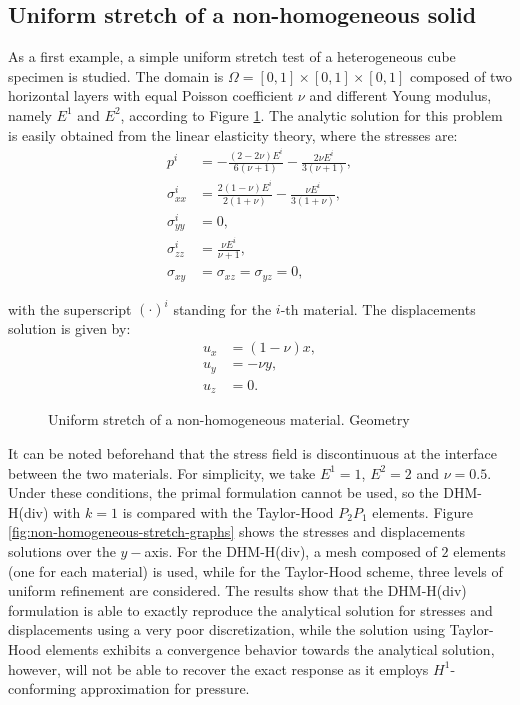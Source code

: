 \documentclass[english,11pt,3p,number,sort&compress]{elsarticle}
\begin{document}
\subsection{Uniform stretch of a non-homogeneous solid \label{subsec:non-homogeneous}}

As a first example, a simple uniform stretch test of a heterogeneous cube specimen is studied. The domain is $\Omega=[0,1] \times [0,1] \times [0,1]$ composed of two horizontal layers with equal Poisson coefficient $\nu$ and different Young modulus, namely $E^1$ and $E^2$, according to Figure \ref{fig:non-homogeneous-stretch-geometry}. The analytic solution for this problem is easily obtained from the linear elasticity theory, where the stresses are:
\begin{equation}
	\begin{aligned}
		p^i &= -\frac{(2-2 \nu ) E^i}{6 (\nu +1)}-\frac{2 \nu 
		E^i}{3 (\nu +1)}, \\
		\sigma^i_{xx} &= \frac{2(1-\nu)E^i}{2(1+\nu)}-\frac{\nu E^i}{3(1+\nu)}, \\
		\sigma^i_{yy} &= 0, \\
		\sigma^i_{zz} &= \frac{\nu E^i}{\nu +1}, \\
		\sigma_{xy} &= \sigma_{xz} = \sigma_{yz} = 0,
	\end{aligned}
\end{equation}

\noindent with the superscript $(\cdot)^i$ standing for the $i$-th material. The displacements solution is given by:
\begin{equation}
	\begin{aligned}
		u_x &= (1-\nu)x, \\
		u_y &= -\nu y, \\
		u_z &= 0.
	\end{aligned}
\end{equation}

\begin{figure}[!htb]
    \centering
    
    \caption{Uniform stretch of a non-homogeneous material. Geometry}
    \label{fig:non-homogeneous-stretch-geometry}
\end{figure}

It can be noted beforehand that the stress field is discontinuous at the interface between the two materials. For simplicity, we take $E^1=1$, $E^2=2$ and $\nu=0.5$. Under these conditions, the primal formulation cannot be used, so the DHM-H(div) with $k=1$ is compared with the Taylor-Hood $P_2P_1$ elements. Figure \ref{fig:non-homogeneous-stretch-graphs} shows the stresses and displacements solutions over the $y-$axis. For the DHM-H(div), a mesh composed of $2$ elements (one for each material) is used, while for the Taylor-Hood scheme, three levels of uniform refinement are considered. The results show that the DHM-H(div) formulation is able to exactly reproduce the analytical solution for stresses and displacements using a very poor discretization, while the solution using Taylor-Hood elements exhibits a convergence behavior towards the analytical solution, however, will not be able to recover the exact response as it employs $H^1$-conforming approximation for pressure.
\end{document}
